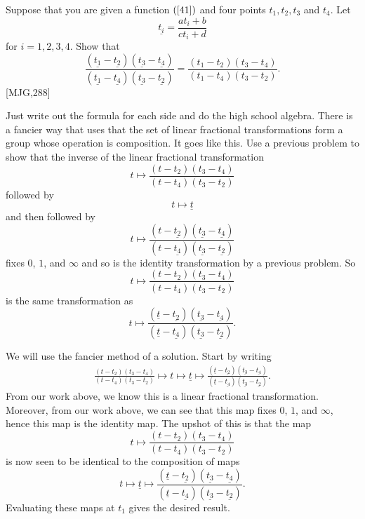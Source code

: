 \documentclass{ximera}
\begin{document}
\begin{problem}
\label{42}Suppose that you are given a function $\left(  \ref{41}\right)  $
and four points $t_{1},t_{2},t_{3}$ and $t_{4}$. Let
\[
\underline{t_{i}}=\frac{at_{i}+b}{ct_{i}+d}%
\]
for $i=1,2,3,4$. Show that%
\[
\frac{(\underline{t_1}-\underline{t_{2}})(\underline{t_{3}}-\underline{t_{4}})}{(\underline{t_1}-\underline{t_{4}})(\underline{t_{3}}-\underline{t_{2}})}=
\frac{(t_1-t_{2})(t_{3}-t_{4})}{(t_1-t_{4})(t_{3}-t_{2})}.
\]
[MJG,288]

\begin{hint}
Just write out the formula for each side and do the high school
algebra.  There is a fancier way that uses that the set of linear
fractional transformations form a group whose operation is
composition. It goes like this. Use a previous problem to show that
the inverse of the linear fractional transformation
\[
t\mapsto\frac{(t-t_2)(t_3-t_4)}{(t-t_4)(t_3-t_2)}
\]
followed by%
\[
t\mapsto\underline{t}%
\]
and then followed by
\[
t\mapsto\frac{(t-\underline{t_2})(\underline{t_3}-\underline{t_4})}{(t-\underline{t_4})(\underline{t_3}-\underline{t_2})}
\]
fixes $0$, $1$, and $\infty$ and so is the identity transformation by a previous problem. So%
\[
t\mapsto\frac{(t-t_2)(t_3-t_4)}{(t-t_4)(t_3-t_2)}
\]
is the same transformation as%
\[
t\mapsto\frac{(\underline{t}-\underline{t_2})(\underline{t_3}-\underline{t_4})}{(\underline{t}-\underline{t_4})(\underline{t_3}-\underline{t_2})}.
\]
\end{hint}
\begin{freeResponse}
We will use the fancier method of a solution. Start by writing
\begin{align*}
\frac{(t-t_2)(t_3-t_4)}{(t-t_4)(t_3-t_2)}
\mapsto t\mapsto \underline{t}\mapsto 
\frac{(\underline{t}-\underline{t_2})(\underline{t_3}-\underline{t_4})}{(\underline{t}-\underline{t_4})(\underline{t_3}-\underline{t_2})}.
\end{align*}
From our work above, we know this is a linear fractional
transformation. Moreover, from our work above, we can see that this
map fixes $0$, $1$, and $\infty$, hence this map is the identity
map. The upshot of this is that the map
\[
t\mapsto\frac{(t-t_2)(t_3-t_4)}{(t-t_4)(t_3-t_2)}
\]
is now seen to be identical to the composition of maps
\[
t\mapsto \underline{t}\mapsto \frac{(\underline{t}-\underline{t_2})(\underline{t_3}-\underline{t_4})}{(\underline{t}-\underline{t_4})(\underline{t_3}-\underline{t_2})}.
\]
Evaluating these maps at $t_1$ gives the desired result. 
\end{freeResponse}
\end{problem}
\end{document}

